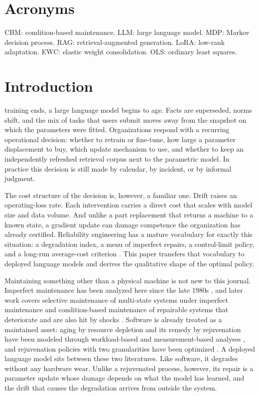 \documentclass[journal]{IEEEtran}
\begin{document}
\section*{Acronyms}
\noindent CBM: condition-based maintenance. LLM: large language model. MDP: Markov decision process. RAG: retrieval-augmented generation. LoRA: low-rank adaptation. EWC: elastic weight consolidation. OLS: ordinary least squares.

\section{Introduction}
 training ends, a large language model begins to age. Facts are superseded, norms shift, and the mix of tasks that users submit moves away from the snapshot on which the parameters were fitted. Organizations respond with a recurring operational decision: whether to retrain or fine-tune, how large a parameter displacement to buy, which update mechanism to use, and whether to keep an independently refreshed retrieval corpus next to the parametric model. In practice this decision is still made by calendar, by incident, or by informal judgment.

The cost structure of the decision is, however, a familiar one. Drift raises an operating-loss rate. Each intervention carries a direct cost that scales with model size and data volume. And unlike a part replacement that returns a machine to a known state, a gradient update can damage competence the organization has already certified. Reliability engineering has a mature vocabulary for exactly this situation: a degradation index, a menu of imperfect repairs, a control-limit policy, and a long-run average-cost criterion \cite{wang2002,jardine2006,vannoortwijk2009,pham1996}. This paper transfers that vocabulary to deployed language models and derives the qualitative shape of the optimal policy.

Maintaining something other than a physical machine is not new to this journal. Imperfect maintenance has been analyzed here since the late 1980s \cite{nakagawa1987}, and later work covers selective maintenance of multi-state systems under imperfect maintenance \cite{liu2010} and condition-based maintenance of repairable systems that deteriorate and are also hit by shocks \cite{rafiee2015}. Software is already treated as a maintained asset: aging by resource depletion and its remedy by rejuvenation have been modeled through workload-based and measurement-based analyses \cite{bao2005,grottke2006}, and rejuvenation policies with two granularities have been optimized \cite{ning2016}. A deployed language model sits between these two literatures. Like software, it degrades without any hardware wear. Unlike a rejuvenated process, however, its repair is a parameter update whose damage depends on what the model has learned, and the drift that causes the degradation arrives from outside the system.
\end{document}
